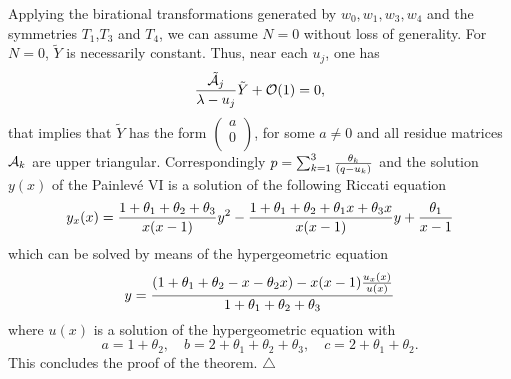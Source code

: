 \documentclass[12pt]{article}
\theoremstyle{definition}
\theoremstyle{theorem}
\begin{document}
Applying the birational transformations generated by $w_0,w_1,w_3,w_4$
and the symmetries $T_1$,$T_3$ and $T_4$, we can assume $N=0$ without
loss of generality. For $N=0$, $\tilde Y$ is necessarily constant. 
Thus, near each $u_j$, one has
$$
{\tilde{\cal A}_j\over\lambda-u_j} \tilde Y+{\cal O}(1)=0,
$$
that implies that $\tilde Y$ has the form 
$\left(\begin{array}{c}a\\ 0\\ \end{array}\right)$, for
some $a\neq0$ and all residue matrices ${\cal A}_k$ are upper
triangular. Correspondingly $p=\sum_{k=1}^3{\theta_k\over(q-u_k)}$ 
and the solution $y(x)$ of the Painlev\'e VI is a solution of the 
following Riccati equation
$$
y_x(x)={1+\theta_1+\theta_2+\theta_3\over x(x-1)} y^2-
{1+\theta_1+\theta_2+\theta_1 x+\theta_3 x\over x(x-1)} y+
{\theta_1\over x-1}\label{ric1}
$$
which can be solved by means of the hypergeometric equation
$$
y={(1+\theta_1+\theta_2-x-\theta_2 x)  -x(x-1) {u_x(x)\over u(x)}
\over 1+\theta_1+\theta_2+\theta_3}
$$
where $u(x)$ is a solution of the hypergeometric equation with 
$$
a=1+\theta_2,\quad b=2+\theta_1+\theta_2+\theta_3, 
\quad c=2+\theta_1+\theta_2.\label{ric2}
$$
This concludes the proof of the theorem.
{\hfill$\bigtriangleup$}
\end{document}

